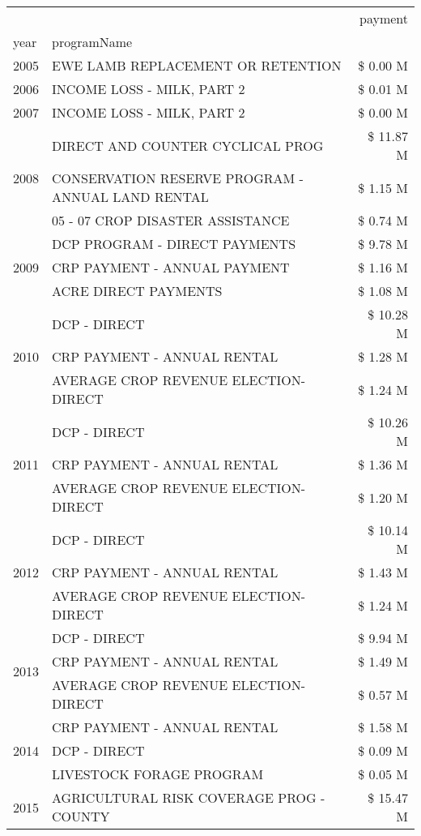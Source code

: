 \begin{tabular}{llr}
\toprule
 &  & payment \\
year & programName &  \\
\midrule
2005 & EWE LAMB REPLACEMENT OR RETENTION & \$ 0.00 M \\
\cline{1-3}
2006 & INCOME LOSS - MILK, PART 2 & \$ 0.01 M \\
\cline{1-3}
2007 & INCOME LOSS - MILK, PART 2 & \$ 0.00 M \\
\cline{1-3}
\multirow[t]{3}{*}{2008} & DIRECT AND COUNTER CYCLICAL PROG & \$ 11.87 M \\
 & CONSERVATION RESERVE PROGRAM - ANNUAL LAND RENTAL & \$ 1.15 M \\
 & 05 - 07 CROP DISASTER ASSISTANCE & \$ 0.74 M \\
\cline{1-3}
\multirow[t]{3}{*}{2009} & DCP PROGRAM - DIRECT PAYMENTS & \$ 9.78 M \\
 & CRP PAYMENT - ANNUAL PAYMENT & \$ 1.16 M \\
 & ACRE DIRECT PAYMENTS & \$ 1.08 M \\
\cline{1-3}
\multirow[t]{3}{*}{2010} & DCP - DIRECT & \$ 10.28 M \\
 & CRP PAYMENT - ANNUAL RENTAL & \$ 1.28 M \\
 & AVERAGE CROP REVENUE ELECTION-DIRECT & \$ 1.24 M \\
\cline{1-3}
\multirow[t]{3}{*}{2011} & DCP - DIRECT & \$ 10.26 M \\
 & CRP PAYMENT - ANNUAL RENTAL & \$ 1.36 M \\
 & AVERAGE CROP REVENUE ELECTION-DIRECT & \$ 1.20 M \\
\cline{1-3}
\multirow[t]{3}{*}{2012} & DCP - DIRECT & \$ 10.14 M \\
 & CRP PAYMENT - ANNUAL RENTAL & \$ 1.43 M \\
 & AVERAGE CROP REVENUE ELECTION-DIRECT & \$ 1.24 M \\
\cline{1-3}
\multirow[t]{3}{*}{2013} & DCP - DIRECT & \$ 9.94 M \\
 & CRP PAYMENT - ANNUAL RENTAL & \$ 1.49 M \\
 & AVERAGE CROP REVENUE ELECTION-DIRECT & \$ 0.57 M \\
\cline{1-3}
\multirow[t]{3}{*}{2014} & CRP PAYMENT - ANNUAL RENTAL & \$ 1.58 M \\
 & DCP - DIRECT & \$ 0.09 M \\
 & LIVESTOCK FORAGE PROGRAM & \$ 0.05 M \\
\cline{1-3}
\multirow[t]{3}{*}{2015} & AGRICULTURAL RISK COVERAGE PROG - COUNTY & \$ 15.47 M \\

\end{tabular}
